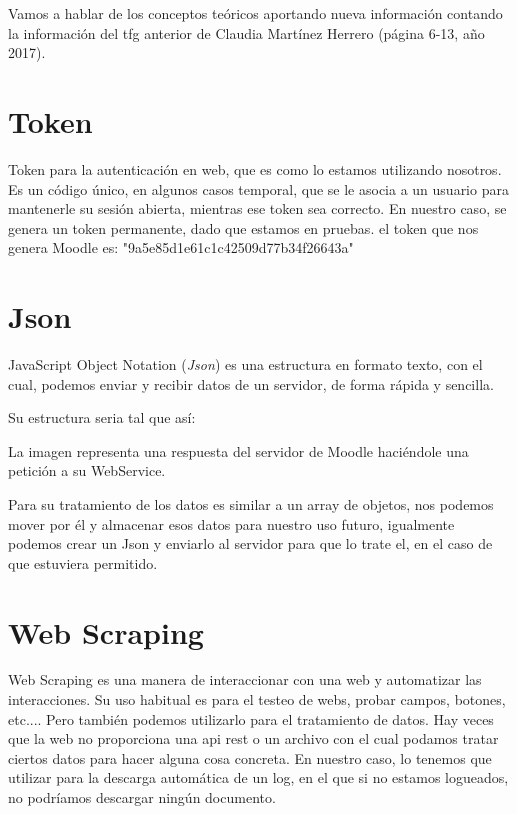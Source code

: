 
Vamos a hablar de los conceptos teóricos aportando nueva información contando la información del tfg anterior de Claudia Martínez Herrero (página 6-13, año 2017). \cite{claudia}




\section{Token}\label{token}

Token para la autenticación en web, que es como lo estamos utilizando nosotros. Es un código único, en algunos casos temporal, que se le asocia a un usuario para mantenerle su sesión abierta, mientras ese token sea correcto. En nuestro caso, se genera un token permanente, dado que estamos en pruebas. el token que nos genera Moodle es: "9a5e85d1e61c1c42509d77b34f26643a"

\section{Json}\label{json}

JavaScript Object Notation (\emph{Json}) es una estructura en formato texto, con el cual, podemos enviar y recibir datos de un servidor, de forma rápida y sencilla. 

Su estructura seria tal que así:


La imagen representa una respuesta del servidor de Moodle haciéndole una petición a su WebService.

Para su tratamiento de los datos es similar a un array de objetos, nos podemos mover por él y almacenar esos datos para nuestro uso futuro, igualmente podemos crear un Json y enviarlo al servidor para que lo trate el, en el caso de que estuviera permitido.

\section{Web Scraping}\label{web-scraping}

Web Scraping es una manera de interaccionar con una web y automatizar las interacciones. Su uso habitual es para  el testeo de webs, probar campos, botones, etc.... Pero también podemos utilizarlo para el tratamiento de datos. Hay veces que la web no proporciona una api rest o un archivo con el cual podamos tratar ciertos datos para hacer alguna cosa concreta. En nuestro caso, lo tenemos que utilizar para la descarga automática de un log, en el que si no estamos logueados, no podríamos descargar ningún documento.

